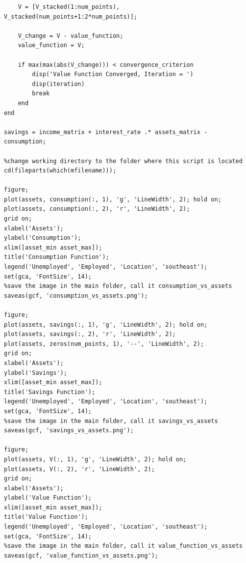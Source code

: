 \documentclass{article}
\begin{document}
\begin{lstlisting}
    V = [V_stacked(1:num_points), V_stacked(num_points+1:2*num_points)];
    
    V_change = V - value_function;
    value_function = V;
    
    if max(max(abs(V_change))) < convergence_criterion
        disp('Value Function Converged, Iteration = ')
        disp(iteration)
        break
    end
end

savings = income_matrix + interest_rate .* assets_matrix - consumption;

%change working directory to the folder where this script is located
cd(fileparts(which(mfilename)));

figure;
plot(assets, consumption(:, 1), 'g', 'LineWidth', 2); hold on;
plot(assets, consumption(:, 2), 'r', 'LineWidth', 2);
grid on;
xlabel('Assets');
ylabel('Consumption');
xlim([asset_min asset_max]);
title('Consumption Function');
legend('Unemployed', 'Employed', 'Location', 'southeast');
set(gca, 'FontSize', 14);
%save the image in the main folder, call it consumption_vs_assets
saveas(gcf, 'consumption_vs_assets.png');

figure;
plot(assets, savings(:, 1), 'g', 'LineWidth', 2); hold on;
plot(assets, savings(:, 2), 'r', 'LineWidth', 2);
plot(assets, zeros(num_points, 1), '--', 'LineWidth', 2);
grid on;
xlabel('Assets');
ylabel('Savings');
xlim([asset_min asset_max]);
title('Savings Function');
legend('Unemployed', 'Employed', 'Location', 'southeast');
set(gca, 'FontSize', 14);
%save the image in the main folder, call it savings_vs_assets
saveas(gcf, 'savings_vs_assets.png');

figure;
plot(assets, V(:, 1), 'g', 'LineWidth', 2); hold on;
plot(assets, V(:, 2), 'r', 'LineWidth', 2);
grid on;
xlabel('Assets');
ylabel('Value Function');
xlim([asset_min asset_max]);
title('Value Function');
legend('Unemployed', 'Employed', 'Location', 'southeast');
set(gca, 'FontSize', 14);
%save the image in the main folder, call it value_function_vs_assets
saveas(gcf, 'value_function_vs_assets.png');
\end{lstlisting}
\end{document}
